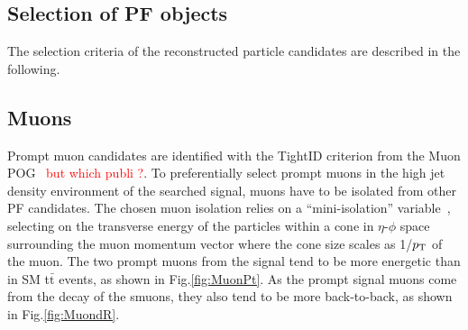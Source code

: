 \documentclass{cernatlasnote}
\newcommand{\ttbar}{t$\bar{\text{t}}$\xspace}
\newcommand{\pt}{$p_{\text T}$\xspace}
\begin{document}
\begin{appendices}
\section{Selection of PF objects}
\label{APP: Objects}
The selection criteria of the reconstructed particle candidates are described in the following. 

\subsection{Muons}
\label{APP: Muons}
Prompt muon candidates are identified with the TightID criterion from the Muon POG~\textcolor{red}{\cite{MuonIDRun2} but which publi ?}.
To preferentially select prompt muons in the high jet density environment of the searched signal,  muons have to be isolated from other PF candidates. The chosen muon isolation relies on a “mini-isolation” variable~\textcolor{red}{\cite{MiniIso1, MiniIso2}}, selecting on the transverse energy of the particles within a cone in $\eta$-$\phi$ space surrounding the muon momentum vector where the cone size scales as 1/\pt of the muon. The two prompt muons from the signal tend to be more energetic than in SM \ttbar events, as shown in Fig.\ref{fig:MuonPt}. As the prompt signal muons come from the decay of the smuons, they also tend to be more back-to-back, as shown in Fig.\ref{fig:MuondR}.


\end{appendices}
\end{document}
